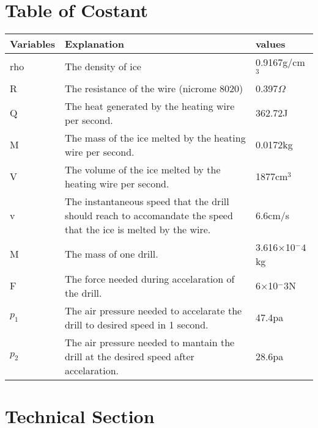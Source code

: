 \documentclass{article}
\begin{document}
\begin{titlepage}
\tableofcontents
\end{titlepage}

\section{Table of Costant} 
\begin{center}
    \begin{tabulary}{\linewidth}{|L|L|L|}
    \hline
    Variables&Explanation&values\\
    \hline 
    rho&The density of ice&0.9167g/cm$^3$\\
    \hline 
    R&The resistance of the wire (nicrome 8020)&0.397$\Omega$\\
    \hline 
    Q&The heat generated by the heating wire per second.&362.72J\\
    \hline 
    M&The mass of the ice melted by the heating wire per second.& 0.0172kg\\
    \hline 
    V&The volume of the ice melted by the heating wire per second.& 1877cm$^3$\\
    \hline 
    v&The instantaneous speed that the drill should reach to accomandate the speed that the ice is melted by the wire.& 6.6cm/s\\
    \hline 
    M&The mass of one drill.&3.616×10$^-4$kg\\
    \hline 
    F& The force needed during accelaration of the drill.&6×10$^-3$N\\
    \hline 
    $p_1$&The air pressure needed to accelarate the drill to desired speed in 1 second.&47.4pa \\
    \hline 
    $p_2$&The air pressure needed to mantain the drill at the desired speed after accelaration.&28.6pa \\
     \hline
    \end{tabulary}
\end{center}
    
    
    
\section{Technical Section}
\end{document}
